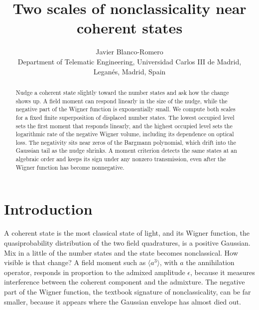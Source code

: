 \documentclass[11pt,a4paper]{article}
\title{Two scales of nonclassicality near coherent states}
\author{Javier Blanco-Romero\\\small Department of Telematic Engineering, Universidad Carlos III de Madrid,\\Legan\'es, Madrid, Spain}
\date{}
\newcommand{\ev}[1]{\langle#1\rangle}
\begin{document}
\maketitle
\begin{abstract}
Nudge a coherent state slightly toward the number states and ask how the change shows up. A field moment can respond linearly in the size of the nudge, while the negative part of the Wigner function is exponentially small. We compute both scales for a fixed finite superposition of displaced number states. The lowest occupied level sets the first moment that responds linearly, and the highest occupied level sets the logarithmic rate of the negative Wigner volume, including its dependence on optical loss. The negativity sits near zeros of the Bargmann polynomial, which drift into the Gaussian tail as the nudge shrinks. A moment criterion detects the same states at an algebraic order and keeps its sign under any nonzero transmission, even after the Wigner function has become nonnegative.
\end{abstract}

\section{Introduction}

A coherent state is the most classical state of light, and its Wigner function, the quasiprobability distribution of the two field quadratures, is a positive Gaussian. Mix in a little of the number states and the state becomes nonclassical. How visible is that change? A field moment such as $\ev{a^3}$, with $a$ the annihilation operator, responds in proportion to the admixed amplitude $\epsilon$, because it measures interference between the coherent component and the admixture. The negative part of the Wigner function, the textbook signature of nonclassicality, can be far smaller, because it appears where the Gaussian envelope has almost died out.
\end{document}
